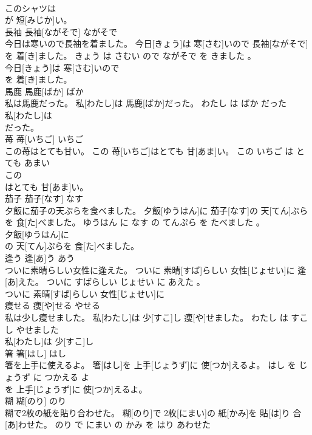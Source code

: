 \documentclass[8pt]{extreport}
\begin{document}
\begin{CJK}{UTF8}{min}
\\	このシャツは
\\	が 短[みじか]い。			
\\	長袖	長袖[ながそで]	ながそで	
\\	今日は寒いので長袖を着ました。	今日[きょう]は 寒[さむ]いので 長袖[ながそで]を 着[き]ました。	きょう は さむい ので ながそで を きました 。	
\\	今日[きょう]は 寒[さむ]いので
\\	を 着[き]ました。			
\\	馬鹿	馬鹿[ばか]	ばか	
\\	私は馬鹿だった。	私[わたし]は 馬鹿[ばか]だった。	わたし は ばか だった	
\\	私[わたし]は
\\	だった。			
\\	苺	苺[いちご]	いちご	
\\	この苺はとても甘い。	この 苺[いちご]はとても 甘[あま]い。	この いちご は とても あまい	
\\	この
\\	はとても 甘[あま]い。			
\\	茄子	茄子[なす]	なす	
\\	夕飯に茄子の天ぷらを食べました。	夕飯[ゆうはん]に 茄子[なす]の 天[てん]ぷらを 食[た]べました。	ゆうはん に なす の てんぷら を たべました 。	
\\	夕飯[ゆうはん]に
\\	の 天[てん]ぷらを 食[た]べました。			
\\	逢う	逢[あ]う	あう	
\\	ついに素晴らしい女性に逢えた。	ついに 素晴[すば]らしい 女性[じょせい]に 逢[あ]えた。	ついに すばらしい じょせい に あえた 。	
\\	ついに 素晴[すば]らしい 女性[じょせい]に
\\	痩せる	痩[や]せる	やせる	
\\	私は少し痩せました。	私[わたし]は 少[すこ]し 痩[や]せました。	わたし は すこし やせました	
\\	私[わたし]は 少[すこ]し
\\	箸	箸[はし]	はし	
\\	箸を上手に使えるよ。	箸[はし]を 上手[じょうず]に 使[つか]えるよ。	はし を じょうず に つかえる よ	
\\	を 上手[じょうず]に 使[つか]えるよ。			
\\	糊	糊[のり]	のり	
\\	糊で2枚の紙を貼り合わせた。	糊[のり]で 2枚[にまい]の 紙[かみ]を 貼[は]り 合[あ]わせた。	のり で にまい の かみ を はり あわせた	

\end{CJK}
\end{document}
